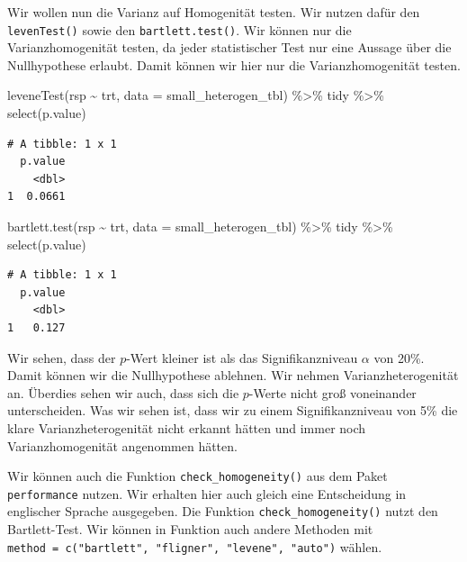 \documentclass[
  letterpaper,
]{scrbook}
\newenvironment{Shaded}{\begin{snugshade}}{\end{snugshade}}
\newcommand{\AttributeTok}[1]{\textcolor[rgb]{0.40,0.45,0.13}{#1}}
\newcommand{\FunctionTok}[1]{\textcolor[rgb]{0.28,0.35,0.67}{#1}}
\newcommand{\NormalTok}[1]{\textcolor[rgb]{0.00,0.23,0.31}{#1}}
\newcommand{\SpecialCharTok}[1]{\textcolor[rgb]{0.37,0.37,0.37}{#1}}
\begin{document}
Wir wollen nun die Varianz auf Homogenität testen. Wir nutzen dafür den
\texttt{levenTest()} sowie den \texttt{bartlett.test()}. Wir können nur
die Varianzhomogenität testen, da jeder statistischer Test nur eine
Aussage über die Nullhypothese erlaubt. Damit können wir hier nur die
Varianzhomogenität testen.

\begin{Shaded}
\begin{Highlighting}[]
\FunctionTok{leveneTest}\NormalTok{(rsp }\SpecialCharTok{\textasciitilde{}}\NormalTok{ trt, }\AttributeTok{data =}\NormalTok{ small\_heterogen\_tbl) }\SpecialCharTok{\%\textgreater{}\%}\NormalTok{ tidy }\SpecialCharTok{\%\textgreater{}\%} \FunctionTok{select}\NormalTok{(p.value)}
\end{Highlighting}
\end{Shaded}

\begin{verbatim}
# A tibble: 1 x 1
  p.value
    <dbl>
1  0.0661
\end{verbatim}

\begin{Shaded}
\begin{Highlighting}[]
\FunctionTok{bartlett.test}\NormalTok{(rsp }\SpecialCharTok{\textasciitilde{}}\NormalTok{ trt, }\AttributeTok{data =}\NormalTok{ small\_heterogen\_tbl) }\SpecialCharTok{\%\textgreater{}\%}\NormalTok{ tidy }\SpecialCharTok{\%\textgreater{}\%} \FunctionTok{select}\NormalTok{(p.value)}
\end{Highlighting}
\end{Shaded}

\begin{verbatim}
# A tibble: 1 x 1
  p.value
    <dbl>
1   0.127
\end{verbatim}

Wir sehen, dass der \(p\)-Wert kleiner ist als das Signifikanzniveau
\(\alpha\) von 20\%. Damit können wir die Nullhypothese ablehnen. Wir
nehmen Varianzheterogenität an. Überdies sehen wir auch, dass sich die
\(p\)-Werte nicht groß voneinander unterscheiden. Was wir sehen ist,
dass wir zu einem Signifikanzniveau von 5\% die klare
Varianzheterogenität nicht erkannt hätten und immer noch
Varianzhomogenität angenommen hätten.

Wir können auch die Funktion \texttt{check\_homogeneity()} aus dem Paket
\texttt{performance} nutzen. Wir erhalten hier auch gleich eine
Entscheidung in englischer Sprache ausgegeben. Die Funktion
\texttt{check\_homogeneity()} nutzt den Bartlett-Test. Wir können in
Funktion auch andere Methoden mit
\texttt{method\ =\ c("bartlett",\ "fligner",\ "levene",\ "auto")}
wählen.
\end{document}
